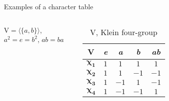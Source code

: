 \documentclass{beamer}
\begin{document}
\begin{frame}{Examples of a character table}
\begin{columns}
        \centering
        $\text{V}=\langle\{a,b\}\rangle$, $a^2=e=b^2$, $ab=ba$
        \vspace{-0.2em}
        \begin{table}[]
        \centering
        \setlength\extrarowheight{3pt}
        \begin{tabular}{|c|c|c|c|c|}
            \hline\textbf{V} & \textbf{\textit{e}} & \textbf{\textit{a}} & \textbf{\textit{b}} & \textbf{\textit{ab}} \\ \hline
            $\boldsymbol{\chi_1}$ & $1$ & $1$ & $1$ & $1$ \\ \hline
            $\boldsymbol{\chi_2}$ & $1$ & $1$ & $-1$ & $-1$ \\ \hline
            $\boldsymbol{\chi_3}$ & $1$ & $-1$ & $1$ & $-1$ \\ \hline
            $\boldsymbol{\chi_4}$ & $1$ & $-1$ & $-1$ & $1$ \\ \hline
        \end{tabular}
        \caption{V, Klein four-group}
    \end{table}
    \end{columns}
\end{frame}
\end{document}
